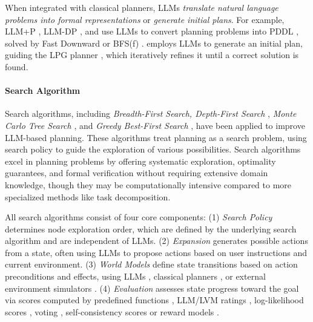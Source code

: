 When integrated with classical planners, LLMs \emph{translate natural language problems into formal representations} or \emph{generate initial plans}. For example, LLM+P \cite{liu2023llm+}, LLM-DP \cite{dagan2023dynamic}, and \citet{guan2023leveraging} use LLMs to convert planning problems into PDDL  \cite{McDermott1998PDDLthePD}, solved by Fast Downward or BFS(f) \cite{lipovetzky2014width}. \citet{valmeekam2023planning} employs LLMs to generate an initial plan, guiding the LPG planner \cite{gerevini2002lpg}, which iteratively refines it until a correct solution is found.  

\vspace{-0.1in}
\paragraph{Search Algorithm} Search algorithms, including \emph{Breadth-First Search, Depth-First Search} \cite{yao2024tree, katz2024thought}, \emph{Monte Carlo Tree Search} \cite{hao2023reasoning, zhou2023language, zhao2024large, shimonte2025}, and \emph{Greedy Best-First Search} \cite{koh2024tree, hirsch2024s}, have been applied to improve LLM-based planning. These algorithms treat planning as a search problem, using search policy to guide the exploration of various possibilities. Search algorithms excel in planning problems by offering systematic exploration, optimality guarantees, and formal verification without requiring extensive domain knowledge, though they may be computationally intensive compared to more specialized methods like task decomposition.

All search algorithms consist of four core components: (1) \emph{Search Policy} determines node exploration order, which are defined by the underlying search algorithm and are independent of LLMs. (2) \emph{Expansion} generates possible actions from a state, often using LLMs to propose actions based on user instructions and current environment. (3) \emph{World Models} define state transitions based on action preconditions and effects, using LLMs \cite{hao2023reasoning}, classical planners \cite{hirsch2024s}, or external environment simulators \cite{zhou2023language, zhao2024large, koh2024tree}. (4) \emph{Evaluation} assesses state progress toward the goal via scores computed by predefined functions \cite{katz2024thought}, LLM/LVM ratings \cite{yao2024tree, hao2023reasoning, zhou2023language}, log-likelihood scores \cite{hirsch2024s}, voting \cite{yao2024tree}, self-consistency scores \cite{zhou2023language} or reward models \cite{chenautonomous2025}. 

